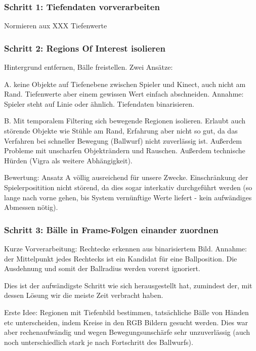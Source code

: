 \documentclass[12pt,a4paper,ngerman]{scrartcl}
\begin{document}
\subsubsection{Schritt 1: Tiefendaten vorverarbeiten}

Normieren aux XXX Tiefenwerte

\subsubsection{Schritt 2: Regions Of Interest isolieren}

Hintergrund entfernen, Bälle freistellen. Zwei Ansätze:

A. keine Objekte auf Tiefenebene zwischen Spieler und Kinect, auch nicht am Rand. Tiefenwerte aber einem gewissen Wert einfach abschneiden. Annahme: Spieler steht auf Linie oder ähnlich. Tiefendaten binarisieren.

B. Mit temporalem Filtering sich bewegende Regionen isolieren. Erlaubt auch störende Objekte wie Stühle am Rand, Erfahrung aber nicht so gut, da das Verfahren bei schneller Bewegung (Ballwurf) nicht zuverlässig ist. Außerdem Probleme mit unscharfen Objekträndern und Rauschen. Außerdem technische Hürden (Vigra als weitere Abhängigkeit).

Bewertung: Ansatz A völlig ausreichend für unsere Zwecke. Einschränkung der Spielerpositition nicht störend, da dies sogar interkativ durchgeführt werden (so lange nach vorne gehen, bis System vernünftige Werte liefert - kein aufwändiges Abmessen nötig).

\subsubsection{Schritt 3: Bälle in Frame-Folgen einander zuordnen}

Kurze Vorverarbeitung: Rechtecke erkennen aus binarisiertem Bild. Annahme: der Mittelpunkt jedes Rechtecks ist ein Kandidat für eine Ballposition. Die Ausdehnung und somit der Ballradius werden vorerst ignoriert.

Dies ist der aufwändigste Schritt wie sich herausgestellt hat, zumindest der, mit dessen Lösung wir die meiste Zeit verbracht haben.

Erste Idee: Regionen mit Tiefenbild bestimmen, tatsächliche Bälle von Händen etc unterscheiden, indem Kreise in den RGB Bildern gesucht werden. Dies war aber rechenaufwändig und wegen Bewegungsunschärfe sehr unzuverlässig (auch noch unterschiedlich stark je nach Fortschritt des Ballwurfs).
\end{document}
